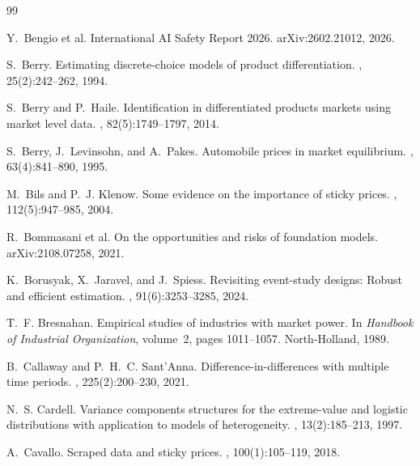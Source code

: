 \documentclass{article}
\begin{document}

\begin{thebibliography}{99}

Y.~Bengio et al.
\newblock International AI Safety Report 2026.
\newblock arXiv:2602.21012, 2026.

S.~Berry.
\newblock Estimating discrete-choice models of product differentiation.
, 25(2):242--262, 1994.

S.~Berry and P.~Haile.
\newblock Identification in differentiated products markets using market level data.
, 82(5):1749--1797, 2014.

S.~Berry, J.~Levinsohn, and A.~Pakes.
\newblock Automobile prices in market equilibrium.
, 63(4):841--890, 1995.

M.~Bils and P.~J. Klenow.
\newblock Some evidence on the importance of sticky prices.
, 112(5):947--985, 2004.

R.~Bommasani et al.
\newblock On the opportunities and risks of foundation models.
\newblock arXiv:2108.07258, 2021.

K.~Borusyak, X.~Jaravel, and J.~Spiess.
\newblock Revisiting event-study designs: Robust and efficient estimation.
, 91(6):3253--3285, 2024.

T.~F. Bresnahan.
\newblock Empirical studies of industries with market power.
\newblock In {\em Handbook of Industrial Organization}, volume~2, pages 1011--1057.
  North-Holland, 1989.

B.~Callaway and P.~H.~C. Sant'Anna.
\newblock Difference-in-differences with multiple time periods.
, 225(2):200--230, 2021.

N.~S. Cardell.
\newblock Variance components structures for the extreme-value and logistic distributions
  with application to models of heterogeneity.
, 13(2):185--213, 1997.

A.~Cavallo.
\newblock Scraped data and sticky prices.
, 100(1):105--119, 2018.


\end{thebibliography}
\end{document}
